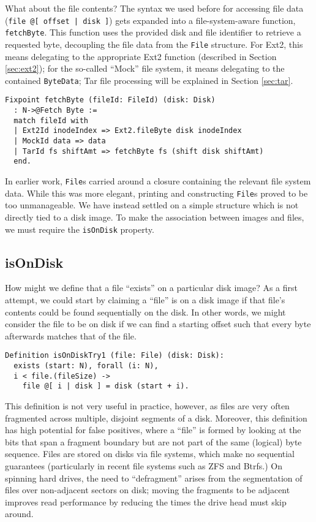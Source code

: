 \documentclass[nocopyrightspace,preprint]{sigplanconf}
\begin{document}
What about the file contents? The syntax we used before for accessing file
data ({\tt file @[ offset | disk ]}) gets expanded into a file-system-aware
function, {\tt fetchByte}. This function uses the provided disk and file
identifier to retrieve a requested byte, decoupling the file data from the
{\tt File} structure. For Ext2, this means delegating to the appropriate Ext2
function (described in Section \ref{sec:ext2}); for the so-called ``Mock''
file system, it means delegating to the contained {\tt ByteData}; Tar file
processing will be explained in Section \ref{sec:tar}.

\begin{lstlisting}
Fixpoint fetchByte (fileId: FileId) (disk: Disk)
  : N->@Fetch Byte := 
  match fileId with
  | Ext2Id inodeIndex => Ext2.fileByte disk inodeIndex
  | MockId data => data
  | TarId fs shiftAmt => fetchByte fs (shift disk shiftAmt)
  end.
\end{lstlisting}

In earlier work, {\tt File}s carried around a closure containing the relevant
file system data. While this was more elegant, printing and constructing
{\tt File}s proved to be too unmanageable. We have instead settled on a simple
structure which is not directly tied to a disk image. To make the association
between images and files, we must require the {\tt isOnDisk} property.

\subsection{isOnDisk}

How might we define that a file ``exists'' on a particular disk image? As a
first attempt, we could start by claiming a ``file'' is on a disk image if
that file's contents could be found sequentially on the disk. In other words,
we might consider the file to be on disk if we can find a starting offset such
that every byte afterwards matches that of the file.

\begin{lstlisting}
Definition isOnDiskTry1 (file: File) (disk: Disk):
  exists (start: N), forall (i: N),
  i < file.(fileSize) -> 
    file @[ i | disk ] = disk (start + i).
\end{lstlisting}

This definition is not very useful in practice, however, as files are very
often fragmented across multiple, disjoint segments of a disk. Moreover, this
definition has high potential for false positives, where a ``file'' is formed
by looking at the bits that span a fragment boundary but are not part of the
same (logical) byte sequence. Files are stored on disks via file systems,
which make no sequential guarantees (particularly in recent file systems such
as ZFS and Btrfs.) On spinning hard drives, the need to ``defragment'' arises
from the segmentation of files over non-adjacent sectors on disk; moving the
fragments to be adjacent improves read performance by reducing the times the
drive head must skip around.
\end{document}
